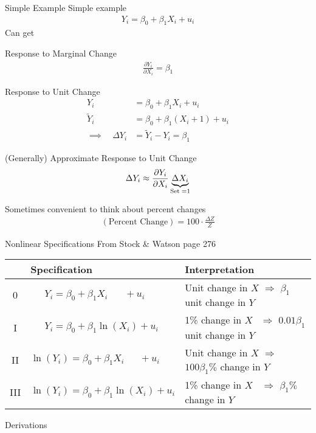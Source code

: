 \documentclass[aspectratio=169, handout]{beamer}
\begin{document}
{\scriptsize
\begin{frame}{Simple Example}
Simple example
\begin{align*}
  Y_i = \beta_0 + \beta_1 X_{i} + u_i
\end{align*}
\vspace{-5pt}
Can get
\begin{itemize}
  {\scriptsize
  \item \alert{Response to Marginal Change}
    \vspace{-5pt}
    \begin{align*}
      \frac{\partial Y_i}{\partial X_i}
      = \beta_1
    \end{align*}
  \item \alert{Response to Unit Change}
    \vspace{-5pt}
    \begin{align*}
      Y_i &= \beta_0 + \beta_1 X_{i} + u_i \\
      \tilde{Y}_i &= \beta_0 + \beta_1 (X_{i}+1) + u_i
      \\
      \implies\quad
      \Delta Y_i
      &=
      \tilde{Y}_i-Y_i
      =
      \beta_1
    \end{align*}
  \item \alert{(Generally) Approximate Response to Unit Change}
    \vspace{-5pt}
    \begin{align*}
      \Delta Y_i
      \approx
      \frac{\partial Y_i}{\partial X_i}
      \underbrace{%
        \Delta X_i
      }_{\text{Set}\; =1}
    \end{align*}
  }
\end{itemize}
Sometimes convenient to think about \alert{percent} changes
\begin{align*}
  (\text{Percent Change})
  =
  100\cdot \frac{\Delta Z}{Z}
\end{align*}
\end{frame}
}


\begin{frame}[shrink]{Nonlinear Specifications}
From Stock \& Watson page 276
\begin{table}
\footnotesize
\begin{tabular}{c|l|l}
   & Specification & Interpretation \\\hline\hline
  0 & $\,\;\quad Y_i = \beta_0 + \beta_1 X_i\quad \;\;\,+u_i$
  & Unit change in $X$ $\Rightarrow$ $\beta_1$ unit change in $Y$
  \\
  I & $\,\;\quad Y_i = \beta_0 + \beta_1\ln(X_i)+u_i$
  & 1\% change in $X$ $\;\,\Rightarrow$ $0.01\beta_1$ unit change in $Y$
  \\
  II & $\ln(Y_i) = \beta_0 + \beta_1 X_i\;\;\quad+u_i$ & Unit change in $X$ $\Rightarrow$ $100\beta_1\%$ change in $Y$
  \\
  III & $\ln(Y_i) = \beta_0 + \beta_1 \ln(X_i)+u_i$
  & 1\% change in $X$ $\;\;\Rightarrow$ $\beta_1\%$ change in $Y$
\end{tabular}
\end{table}
Derivations
\end{frame}
\end{document}
